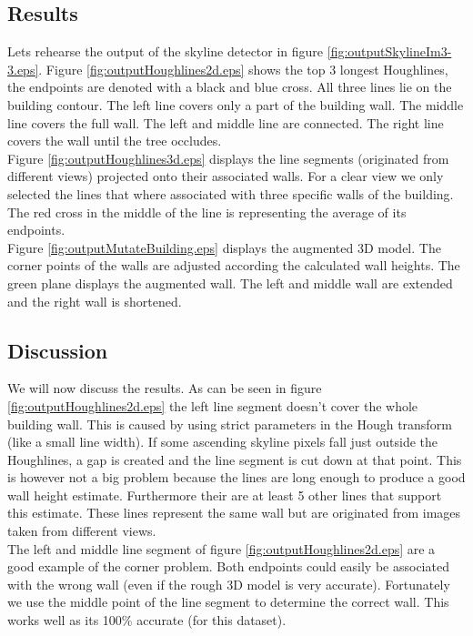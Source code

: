 \documentclass[10pt]{article}
\begin{document}
	

\subsection{Results}
Lets rehearse the output of the skyline detector in figure \ref{fig:outputSkylineIm3-3.eps}.
Figure \ref{fig:outputHoughlines2d.eps} shows the top 3 longest Houghlines, the
endpoints are denoted with a black and blue cross. All three lines lie on the
building contour.  The left line covers only a part of the building wall. The
middle line covers the full wall. The left and middle line are connected. The
right line covers the wall until the tree occludes.\\

Figure \ref{fig:outputHoughlines3d.eps} displays the line segments (originated from
different views) projected onto their associated walls.  For a clear view we
only selected the lines that where associated with three specific walls of the building.  
The red cross in the middle of the line is representing the average of its endpoints.\\

Figure \ref{fig:outputMutateBuilding.eps} displays the augmented 3D model. The
corner points of the walls are adjusted according the calculated wall heights.
The green plane displays the augmented wall. The left and middle wall are extended
and the right wall is shortened.\\


\subsection{Discussion}
We will now discuss the results. As can be seen in figure \ref{fig:outputHoughlines2d.eps} the left line segment doesn't cover the whole building wall. This is caused by using strict parameters in the Hough transform (like a small line width).
If some ascending skyline pixels fall just outside the Houghlines, a gap is created and the line segment is cut down at that point. This is however not a big problem because the lines are long enough to produce a good wall height estimate. Furthermore their are at least 5 other lines that support this estimate. These lines represent the same wall but are originated from images taken from different views. \\
The left and middle line segment of figure \ref{fig:outputHoughlines2d.eps} are a good example of the corner problem. Both endpoints could easily be associated with the wrong wall (even if the rough 3D model is very accurate). Fortunately we use the middle point of the line segment to determine the correct wall. This works well as its 100\% accurate (for this dataset).
\end{document}

